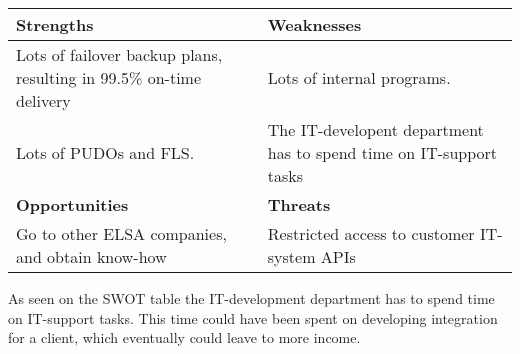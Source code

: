 \vspace{2mm}
\begin{tabular}{| p{} | p{} |}
\hline
\rowcolor{GR}
\textbf{Strengths} & \textbf{Weaknesses} \\ \hline
Lots of failover backup plans, resulting in 99.5\% on-time delivery & Lots of internal programs.
\\ \hline
Lots of PUDOs and FLS. & The IT-developent department has to spend time on IT-support tasks \\ \hline \hline
\rowcolor{GR}
\textbf{Opportunities} & \textbf{Threats} \\ \hline
Go to other ELSA companies, and obtain know-how & Restricted access to customer IT-system APIs \\ \hline
\end{tabular}
\qquad

As seen on the SWOT table the IT-development department has to spend time on IT-support tasks. This time could have been spent on developing integration for a client, which eventually could leave to more income.